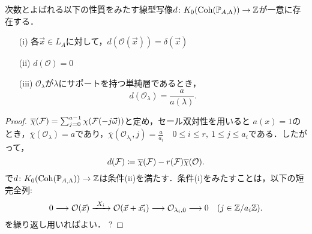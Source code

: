\begin{prop}
	次数とよばれる以下の性質をみたす線型写像$d\colon K_0(\operatorname{\mathrm{Coh}}({\mathbb P}_{A,\Lambda}))\to {\mathbb Z}$が一意に存在する．
	\begin{itemize}
		\item[(i)]
			各$\vec{x}\in L_A$に対して，$d(\mathcal{O}(\vec{x})) = \delta(\vec{x})$
		\item[(ii)]
			$d(\mathcal{O}) = 0$
		\item[(iii)]
			$\mathcal{O}_{\lambda}$が$\lambda$にサポートを持つ単純層であるとき，
		\[ d(\mathcal{O}_{\lambda}) = \frac{a}{a(\lambda)}.\]
	\end{itemize}
\end{prop}
\begin{proof}
$\overline{\chi}({\mathcal F}) = \sum_{j=0}^{a-1}\chi({\mathcal F}(-j\vec{\omega}))$と定め，セール双対性を用いると
$a(x)=1$のとき，$\overline{\chi}(\mathcal{O}_\lambda) = a$であり，$\overline{\chi}(\mathcal{O}_{\lambda_i},j) = \frac{a}{a_i}\quad 0\le i \le r,\ 1\le j \le a_i$である．したがって，
\[d({\mathcal F}) \coloneq \overline{\chi}({\mathcal F}) - r({\mathcal F})\overline{\chi}(\mathcal{O}).\]
で$d\colon K_0(\operatorname{\mathrm{Coh}}({\mathbb P}_{A,\Lambda}))\to{\mathbb Z}$は条件(ii)を満たす．条件(i)をみたすことは，以下の短完全列:
\[0\longrightarrow \mathcal{O}(\vec{x})\xrightarrow{\ X_i\ }\mathcal{O}(\vec{x}+\vec{x_i})\longrightarrow \mathcal{O}_{\lambda_i,0}\longrightarrow 0\quad (j\in \ZZ/a_i\ZZ).\]
を繰り返し用いればよい．{\color{red} ?}
\end{proof}

